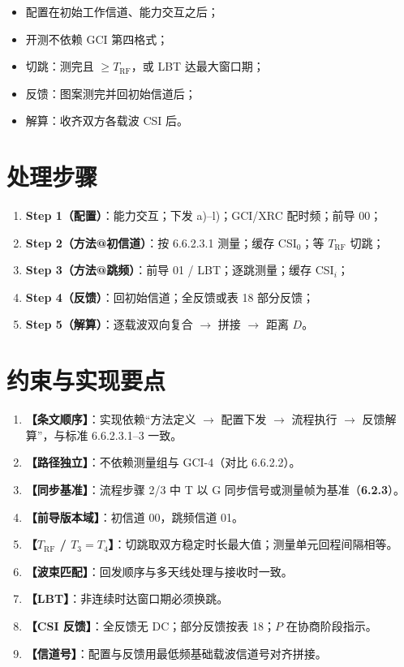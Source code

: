 \documentclass[11pt,a4paper]{ctexart}
\begin{document}
\begin{itemize}[nosep]
  \item 配置在初始工作信道、能力交互之后；
  \item 开测不依赖 GCI 第四格式；
  \item 切跳：测完且 $\ge T_{\mathrm{RF}}$，或 LBT 达最大窗口期；
  \item 反馈：图案测完并回初始信道后；
  \item 解算：收齐双方各载波 CSI 后。
\end{itemize}

\section{处理步骤}

\begin{enumerate}[nosep]
  \item \textbf{Step 1（配置）}：能力交互；下发 a)--l)；GCI/XRC 配时频；前导 00；
  \item \textbf{Step 2（方法@初信道）}：按 6.6.2.3.1 测量；缓存 CSI$_0$；等 $T_{\mathrm{RF}}$ 切跳；
  \item \textbf{Step 3（方法@跳频）}：前导 01 / LBT；逐跳测量；缓存 CSI$_i$；
  \item \textbf{Step 4（反馈）}：回初始信道；全反馈或表 18 部分反馈；
  \item \textbf{Step 5（解算）}：逐载波双向复合 $\rightarrow$ 拼接 $\rightarrow$ 距离 $D$。
\end{enumerate}

\section{约束与实现要点}

\begin{enumerate}[nosep]
  \item \textbf{【条文顺序】}：实现依赖``方法定义 $\rightarrow$ 配置下发 $\rightarrow$ 流程执行 $\rightarrow$ 反馈解算''，与标准 6.6.2.3.1--3 一致。
  \item \textbf{【路径独立】}：不依赖测量组与 GCI-4（对比 6.6.2.2）。
  \item \textbf{【同步基准】}：流程步骤 2/3 中 T 以 G 同步信号或测量帧为基准（\textbf{6.2.3}）。
  \item \textbf{【前导版本域】}：初信道 00，跳频信道 01。
  \item \textbf{【$T_{\mathrm{RF}}$ / $T_3=T_4$】}：切跳取双方稳定时长最大值；测量单元回程间隔相等。
  \item \textbf{【波束匹配】}：回发顺序与多天线处理与接收时一致。
  \item \textbf{【LBT】}：非连续时达窗口期必须换跳。
  \item \textbf{【CSI 反馈】}：全反馈无 DC；部分反馈按表 18；$P$ 在协商阶段指示。
  \item \textbf{【信道号】}：配置与反馈用最低频基础载波信道号对齐拼接。
\end{enumerate}
\end{document}
